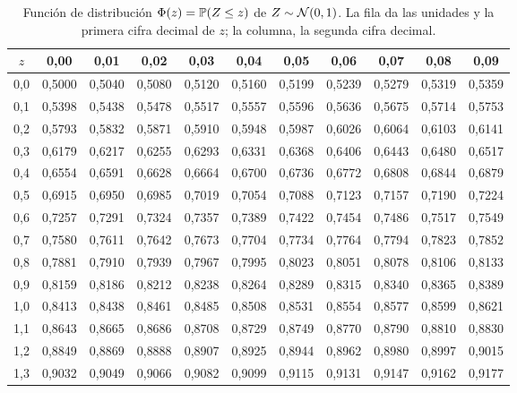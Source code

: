 \begin{table}[ht]
\centering\footnotesize
\caption{Función de distribución $\Phi(z)=\mathbb{P}(Z\le z)$ de $Z\sim\mathcal{N}(0,1)$. La fila da las unidades y la primera cifra decimal de $z$; la columna, la segunda cifra decimal.}\label{tab:phi}
\setlength{\tabcolsep}{3.6pt}
\begin{tabular}{@{}c|cccccccccc@{}}
\toprule
$z$ & 0{,}00 & 0{,}01 & 0{,}02 & 0{,}03 & 0{,}04 & 0{,}05 & 0{,}06 & 0{,}07 & 0{,}08 & 0{,}09 \\
\midrule
0{,}0 & 0{,}5000 & 0{,}5040 & 0{,}5080 & 0{,}5120 & 0{,}5160 & 0{,}5199 & 0{,}5239 & 0{,}5279 & 0{,}5319 & 0{,}5359 \\
0{,}1 & 0{,}5398 & 0{,}5438 & 0{,}5478 & 0{,}5517 & 0{,}5557 & 0{,}5596 & 0{,}5636 & 0{,}5675 & 0{,}5714 & 0{,}5753 \\
0{,}2 & 0{,}5793 & 0{,}5832 & 0{,}5871 & 0{,}5910 & 0{,}5948 & 0{,}5987 & 0{,}6026 & 0{,}6064 & 0{,}6103 & 0{,}6141 \\
0{,}3 & 0{,}6179 & 0{,}6217 & 0{,}6255 & 0{,}6293 & 0{,}6331 & 0{,}6368 & 0{,}6406 & 0{,}6443 & 0{,}6480 & 0{,}6517 \\
0{,}4 & 0{,}6554 & 0{,}6591 & 0{,}6628 & 0{,}6664 & 0{,}6700 & 0{,}6736 & 0{,}6772 & 0{,}6808 & 0{,}6844 & 0{,}6879 \\
0{,}5 & 0{,}6915 & 0{,}6950 & 0{,}6985 & 0{,}7019 & 0{,}7054 & 0{,}7088 & 0{,}7123 & 0{,}7157 & 0{,}7190 & 0{,}7224 \\
0{,}6 & 0{,}7257 & 0{,}7291 & 0{,}7324 & 0{,}7357 & 0{,}7389 & 0{,}7422 & 0{,}7454 & 0{,}7486 & 0{,}7517 & 0{,}7549 \\
0{,}7 & 0{,}7580 & 0{,}7611 & 0{,}7642 & 0{,}7673 & 0{,}7704 & 0{,}7734 & 0{,}7764 & 0{,}7794 & 0{,}7823 & 0{,}7852 \\
0{,}8 & 0{,}7881 & 0{,}7910 & 0{,}7939 & 0{,}7967 & 0{,}7995 & 0{,}8023 & 0{,}8051 & 0{,}8078 & 0{,}8106 & 0{,}8133 \\
0{,}9 & 0{,}8159 & 0{,}8186 & 0{,}8212 & 0{,}8238 & 0{,}8264 & 0{,}8289 & 0{,}8315 & 0{,}8340 & 0{,}8365 & 0{,}8389 \\
1{,}0 & 0{,}8413 & 0{,}8438 & 0{,}8461 & 0{,}8485 & 0{,}8508 & 0{,}8531 & 0{,}8554 & 0{,}8577 & 0{,}8599 & 0{,}8621 \\
1{,}1 & 0{,}8643 & 0{,}8665 & 0{,}8686 & 0{,}8708 & 0{,}8729 & 0{,}8749 & 0{,}8770 & 0{,}8790 & 0{,}8810 & 0{,}8830 \\
1{,}2 & 0{,}8849 & 0{,}8869 & 0{,}8888 & 0{,}8907 & 0{,}8925 & 0{,}8944 & 0{,}8962 & 0{,}8980 & 0{,}8997 & 0{,}9015 \\
1{,}3 & 0{,}9032 & 0{,}9049 & 0{,}9066 & 0{,}9082 & 0{,}9099 & 0{,}9115 & 0{,}9131 & 0{,}9147 & 0{,}9162 & 0{,}9177 \\

\end{tabular}
\end{table}
